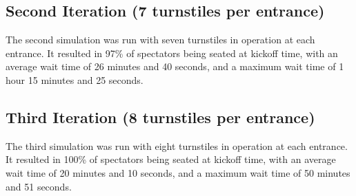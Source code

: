 \documentclass[11pt]{article}
\begin{document}
    \subsection{Second Iteration (7 turnstiles per entrance)}
    The second simulation was run with seven turnstiles in operation at each entrance.
    It resulted in 97\% of spectators being seated at kickoff time, with an average wait time of 26 minutes and 40
    seconds, and a maximum wait time of 1 hour 15 minutes and 25 seconds.

    \subsection{Third Iteration (8 turnstiles per entrance)}
    The third simulation was run with eight turnstiles in operation at each entrance.
    It resulted in 100\% of spectators being seated at kickoff time, with an average wait time of 20 minutes and 10
    seconds, and a maximum wait time of 50 minutes and 51 seconds.
\end{document}
